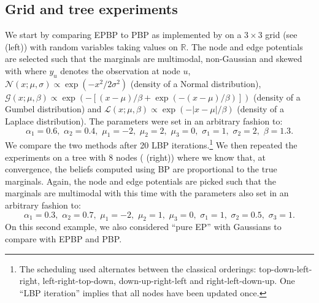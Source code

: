 \subsection{Grid and tree experiments}
We start by comparing EPBP to PBP as implemented by \citet{ihler09} on a $3\times 3$ grid (see  (left)) with random variables taking values on $\mathbb R$. The node and edge potentials are selected such that the marginals are multimodal, non-Gaussian and skewed with
where $y_{u}$ denotes the observation at node $u$, $\mathcal N(x;\mu,\sigma)\propto \exp(-x^{2}/2\sigma^{2})$ (density of a Normal distribution), $\mathcal G(x;\mu,\beta)\propto \exp(-[(x-\mu)/\beta+\exp(-(x-\mu)/\beta)])$ (density of a Gumbel distribution) and $\mathcal L(x;\mu,\beta)\propto \exp(-|x-\mu|/\beta)$ (density of a Laplace distribution). The parameters were set in an arbitrary fashion to:
$$ \alpha_{1}=0.6,\,\, \alpha_{2}=0.4,\,\, \mu_{1}=-2,\,\,\mu_{2}=2,\,\,\mu_{3}=0, \,\,\sigma_{1}=1, \,\,\sigma_{2}=2, \,\,\beta=1.3. $$
We compare the two methods after 20 LBP iterations.\footnote{The scheduling used alternates between the classical orderings: top-down-left-right, left-right-top-down, down-up-right-left and right-left-down-up. One ``LBP iteration'' implies that all nodes have been updated once.} 
We then repeated the experiments on a tree with 8 nodes ( (right)) where we know that, at convergence, the beliefs computed using BP are proportional to the true marginals. Again, the node and edge potentials are picked such that the marginals are multimodal with this time
with the parameters also set in an arbitrary fashion to:
$$\alpha_{1}=0.3,\,\,\alpha_{2}=0.7,\,\,\mu_{1}=-2,\,\,\mu_{2}=1,\,\,\mu_{3}=0,\,\,\sigma_{1}=1,\,\,\sigma_{2}=0.5,\,\,\sigma_{3}=1.$$
On this second example, we also considered ``pure EP'' with Gaussians to compare with EPBP and PBP. 


